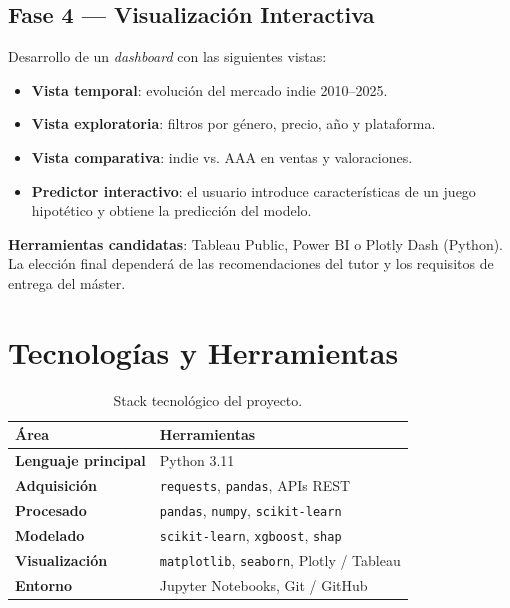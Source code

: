 \documentclass[12pt, a4paper]{article}
\begin{document}
\subsection{Fase 4 --- Visualizaci\'on Interactiva}

Desarrollo de un \textit{dashboard} con las siguientes vistas:

\begin{itemize}
  \item \textbf{Vista temporal}: evoluci\'on del mercado indie 2010--2025.
  \item \textbf{Vista exploratoria}: filtros por g\'enero, precio, a\~no y plataforma.
  \item \textbf{Vista comparativa}: indie vs. AAA en ventas y valoraciones.
  \item \textbf{Predictor interactivo}: el usuario introduce caracter\'isticas de un juego hipot\'etico y obtiene la predicci\'on del modelo.
\end{itemize}

\textbf{Herramientas candidatas}: Tableau Public, Power BI o Plotly Dash (Python). La elecci\'on final depender\'a de las recomendaciones del tutor y los requisitos de entrega del m\'aster.

\section{Tecnolog\'ias y Herramientas}

\begin{table}[h!]
\centering
\renewcommand{\arraystretch}{1.4}
\begin{tabular}{>{\bfseries}p{3cm} p{9.5cm}}
\toprule
\'Area & Herramientas \\
\midrule
Lenguaje principal  & Python 3.11 \\
Adquisici\'on         & \texttt{requests}, \texttt{pandas}, APIs REST \\
Procesado           & \texttt{pandas}, \texttt{numpy}, \texttt{scikit-learn} \\
Modelado            & \texttt{scikit-learn}, \texttt{xgboost}, \texttt{shap} \\
Visualizaci\'on       & \texttt{matplotlib}, \texttt{seaborn}, Plotly / Tableau \\
Entorno             & Jupyter Notebooks, Git / GitHub \\
\bottomrule
\end{tabular}
\caption{Stack tecnol\'ogico del proyecto.}
\end{table}
\end{document}
